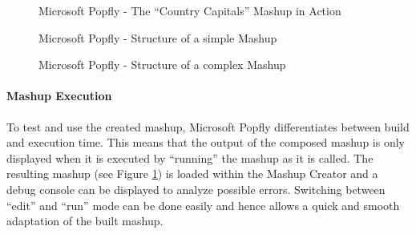 \begin{figure}
	\centering
	\caption{Microsoft Popfly - The ``Country Capitals'' Mashup in Action}
	\label{fig:microsoft_popfly_capitals}
\end{figure}

\begin{figure}
	\centering
	\caption{Microsoft Popfly - Structure of a simple Mashup}
	\label{fig:microsoft_popfly_concept_of_a_simple_mashup}
\end{figure}

\begin{figure}
	\centering
	\caption{Microsoft Popfly - Structure of a complex Mashup}
	\label{fig:microsoft_popfly_concept_of_a_complex_mashup}
\end{figure}

\paragraph{Mashup Execution}
To test and use the created mashup, Microsoft Popfly differentiates between build and execution
time. This means that the output of the composed mashup is only displayed when it is executed by
``running'' the mashup as it is called. The resulting mashup (see Figure
\ref{fig:microsoft_popfly_capitals}) is loaded within the Mashup Creator and a debug console can be
displayed to analyze possible errors. Switching between ``edit'' and ``run'' mode can be done
easily and hence allows a quick and smooth adaptation of the built mashup.

